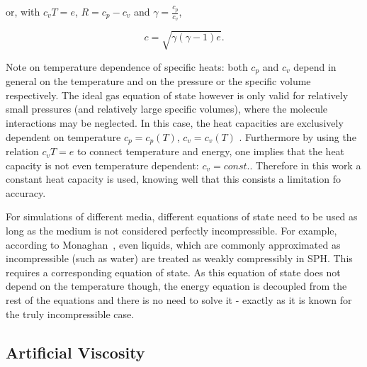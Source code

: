 \documentclass{report}
\begin{document}
or, with $c_v T=e$, $R=c_p-c_v$ and $\gamma=\frac{c_p}{c_v}$,

\begin{equation}
 c=\sqrt{\gamma(\gamma-1)e}.
\end{equation}

Note on temperature dependence of specific heats: both $c_p$ and $c_v$ depend in general on the temperature and on the pressure or the specific volume respectively. The ideal gas equation of state however is only valid for relatively small pressures (and relatively large specific volumes), where the molecule interactions may be neglected. In this case, the heat capacities are exclusively dependent on temperature $c_p=c_p(T)$, $c_v=c_v(T)$ \cite{EINTHERMOBUCH}. Furthermore by using the relation $c_v T=e$ to connect temperature and energy, one implies that the heat capacity is not even temperature dependent: $c_v=const.$. 
Therefore in this work a constant heat capacity is used, knowing well that this consists a limitation fo accuracy.


For simulations of different media, different equations of state need to be used as long as the medium is not considered perfectly incompressible. For example, according to Monaghan~\cite{Monaghan1994,Monaghan2005}, even liquids, which are commonly approximated as incompressible (such as water) are treated as weakly compressibly in SPH. This requires a corresponding equation of state. As this equation of state does not depend on the temperature though, the energy equation is decoupled from the rest of the equations and there is no need to solve it - exactly as it is known for the truly incompressible case.

\subsection{Artificial Viscosity}
\label{sec:ArtVisc}
\end{document}

